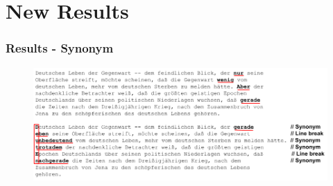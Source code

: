 \documentclass{beamer}
\begin{document}
\section{New Results}

\begin{frame}
\frametitle{Results - Synonym}
\begin{figure}
\includegraphics[scale=0.35]{beispiel-synonym}
\end{figure}
\end{frame}
\end{document}
